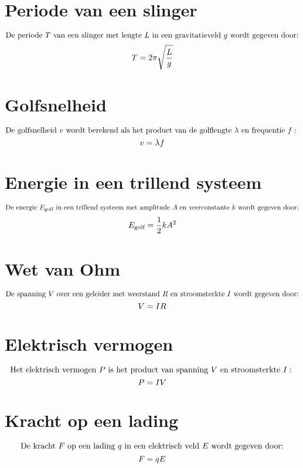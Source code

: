 \documentclass{article}
\begin{document}
\section*{Periode van een slinger}
\[ \text{De periode } T \text{ van een slinger met lengte } L \text{ in een gravitatieveld } g \text{ wordt gegeven door:} \\
\]
\[ T = 2 \pi \sqrt{\frac{L}{g}} \\
\]

\section*{Golfsnelheid}
\[ \text{De golfsnelheid } v \text{ wordt berekend als het product van de golflengte } \lambda \text{ en frequentie } f: \\
\]
\[ v = \lambda f \\
\]

\section*{Energie in een trillend systeem}
\[ \text{De energie } E_{\text{golf}} \text{ in een trillend systeem met amplitude } A \text{ en veerconstante } k \text{ wordt gegeven door:} \\
\]
\[ E_{\text{golf}} = \frac{1}{2} k A^2 \\
\]

\section*{Wet van Ohm}
\[ \text{De spanning } V \text{ over een geleider met weerstand } R \text{ en stroomsterkte } I \text{ wordt gegeven door:} \\
\]
\[ V = IR \\
\]

\section*{Elektrisch vermogen}
\[ \text{Het elektrisch vermogen } P \text{ is het product van spanning } V \text{ en stroomsterkte } I: \\
\]
\[ P = IV \\
\]

\section*{Kracht op een lading}
\[ \text{De kracht } F \text{ op een lading } q \text{ in een elektrisch veld } E \text{ wordt gegeven door:} \\
\]
\[ F = qE \\
\]
\end{document}
